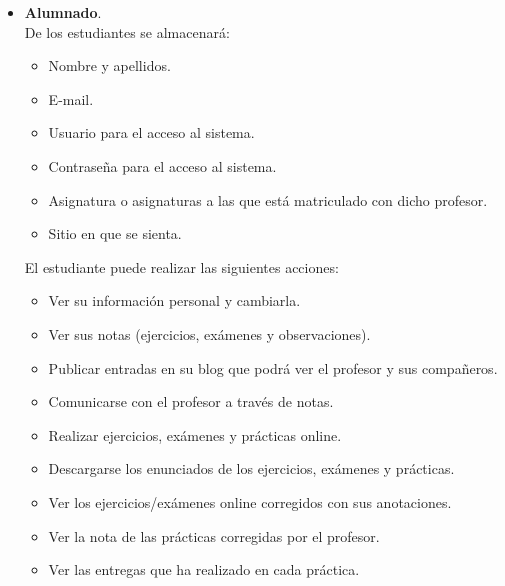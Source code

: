 \documentclass[12pt,twoside,a4paper]{article}
\begin{document}
\begin{itemize}
\item \textbf{Alumnado}.\\
De los estudiantes se almacenará:
\begin{itemize}
\item Nombre y apellidos.
\item E-mail.
\item Usuario para el acceso al sistema.
\item Contraseña para el acceso al sistema.
\item Asignatura o asignaturas a las que está matriculado con dicho profesor.
\item Sitio en que se sienta.
\end{itemize}
El estudiante puede realizar las siguientes acciones:
\begin{itemize}
\item Ver su información personal y cambiarla.
\item Ver sus notas (ejercicios, exámenes y observaciones).
\item Publicar entradas en su blog que podrá ver el profesor y sus compañeros.
\item Comunicarse con el profesor a través de notas.
\item Realizar ejercicios, exámenes y prácticas online.
\item Descargarse los enunciados de los ejercicios, exámenes y prácticas.
\item Ver los ejercicios/exámenes online corregidos con sus anotaciones.
\item Ver la nota de las prácticas corregidas por el profesor.
\item Ver las entregas que ha realizado en cada práctica.
\end{itemize}
\end{itemize}
\end{document}
